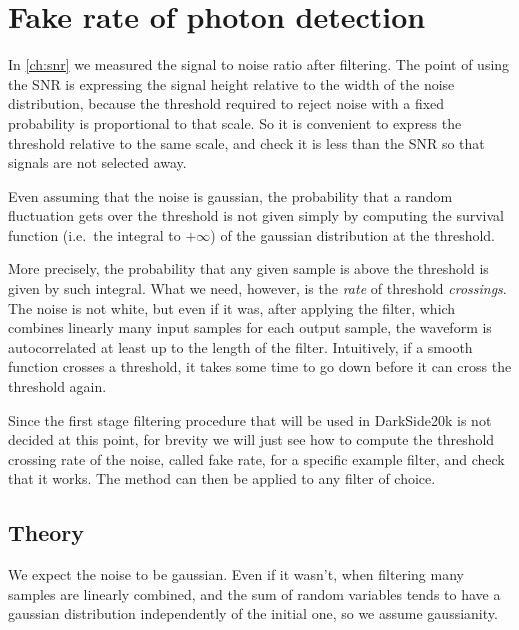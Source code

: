 \chapter{Fake rate of photon detection}
\label{ch:rate}

In \autoref{ch:snr} we measured the signal to noise ratio after filtering.
The point of using the SNR is expressing the signal height relative to the
width of the noise distribution, because the threshold required to reject noise
with a fixed probability is proportional to that scale. So it is convenient to
express the threshold relative to the same scale, and check it is less than the
SNR so that signals are not selected away.


Even assuming that the noise is gaussian, the probability that a random
fluctuation gets over the threshold is not given simply by computing the
survival function (i.e.\ the integral to $+\infty$) of the gaussian
distribution at the threshold.

More precisely, the probability that any given sample is above the threshold is
given by such integral. What we need, however, is the \emph{rate} of threshold
\emph{crossings}. The noise is not white, but even if it was, after applying
the filter, which combines linearly many input samples for each output sample,
the waveform is autocorrelated at least up to the length of the filter.
Intuitively, if a smooth function crosses a threshold, it takes some time to go
down before it can cross the threshold again.

Since the first stage filtering procedure that will be used in DarkSide20k is
not decided at this point, for brevity we will just see how to compute the
threshold crossing rate of the noise, called fake rate, for a specific example
filter, and check that it works. The method can then be applied to any filter
of choice.


\section{Theory}

We expect the noise to be gaussian. Even if it wasn't, when filtering many
samples are linearly combined, and the sum of random variables tends to have a
gaussian distribution independently of the initial one, so we assume
gaussianity.

